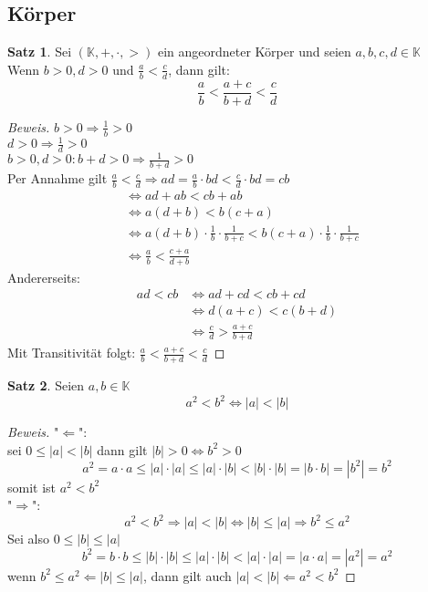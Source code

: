 \documentclass[12pt,a4paper,titlepage]{article} %
\theoremstyle{definition}
\newtheorem{satz}{Satz}[subsection]
\theoremstyle{remark}
\newenvironment{bew}{\begin{proof}[Beweis]}{\end{proof}}
\newcommand{\K}{\mathbb{K}}
\begin{document}
	\subsection{Körper}
	\begin{satz}
		Sei \((\K,+,\cdot, >)\) ein angeordneter Körper und seien \(a,b,c,d \in \K\)\\
		Wenn \(b > 0, d > 0\) und \(\frac{a}{b} < \frac{c}{d}\), dann gilt:
		\[\frac{a}{b} < \frac{a+c}{b + d} < \frac{c}{d}\]
	\end{satz}
	\begin{bew}
		\(b > 0 \Rightarrow \frac{1}{b} > 0\)\\
		\(d > 0 \Rightarrow \frac{1}{d} > 0\)\\
		\(b > 0, d > 0: b+d > 0 \Rightarrow \frac{1}{b+d} > 0\)\\
		Per Annahme gilt \(\frac{a}{b} < \frac{c}{d} \Rightarrow ad = \frac{a}{b} \cdot bd < \frac{c}{d} \cdot bd = cb\)
		\begin{align*}
			&\Leftrightarrow ad + ab < cb + ab\\
			&\Leftrightarrow a(d+b) < b(c+a)\\
			&\Leftrightarrow a(d+b) \cdot \frac{1}{b} \cdot \frac{1}{b+c} < b(c+a) \cdot \frac{1}{b} \cdot \frac{1}{b+c}\\
			&\Leftrightarrow \frac{a}{b} < \frac{c+a}{d+b}
		\end{align*}
		Andererseits:
		\begin{align*}
			ad < cb &\Leftrightarrow ad + cd < cb + cd\\
			&\Leftrightarrow d(a+c) < c(b+d)\\
			&\Leftrightarrow \frac{c}{d} > \frac{a+c}{b+d}
		\end{align*}
		Mit Transitivität folgt: \(\frac{a}{b} < \frac{a+c}{b + d} < \frac{c}{d}\)
	\end{bew}
	\begin{satz}
		Seien \(a,b \in \K\)
		\[a^2 < b^2 \Leftrightarrow |a| < |b|\]
	\end{satz}
	\begin{bew}
		"\(\Leftarrow\)":\\
		sei \(0 \leq |a| < |b|\) dann gilt \(|b| > 0 \Leftrightarrow b^2 > 0\)\\
		\[a^2 = a \cdot a \leq |a| \cdot |a| \leq |a| \cdot |b| < |b| \cdot |b| = |b \cdot b| = |b^2| = b^2\]
		somit ist \(a^2 < b^2\)\\
		"\(\Rightarrow\)":\\
		\[a^2 < b^2 \Rightarrow |a| < |b| \Leftrightarrow |b| \leq |a| \Rightarrow b^2 \leq a^2\]
		Sei also \(0 \leq |b| \leq |a|\)\\
		\[b^2 = b \cdot b \leq |b| \cdot |b| \leq |a| \cdot |b| < |a| \cdot |a| = |a \cdot a| = |a^2| = a^2\]
		wenn \(b^2 \leq a^2 \Leftarrow |b| \leq |a|\), dann gilt auch \(|a| < |b| \Leftarrow a^2 < b^2\)
	\end{bew}
\end{document}
